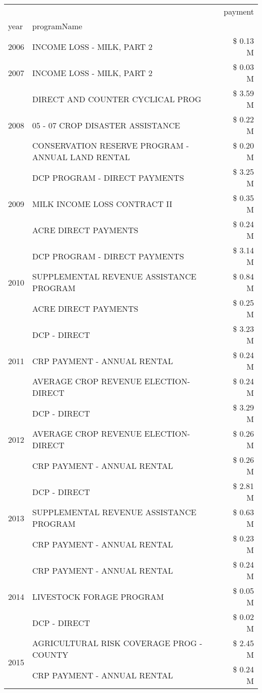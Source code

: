 \begin{tabular}{llr}
\toprule
 &  & payment \\
year & programName &  \\
\midrule
2006 & INCOME LOSS - MILK, PART 2 & \$ 0.13 M \\
\cline{1-3}
2007 & INCOME LOSS - MILK, PART 2 & \$ 0.03 M \\
\cline{1-3}
\multirow[t]{3}{*}{2008} & DIRECT AND COUNTER CYCLICAL PROG & \$ 3.59 M \\
 & 05 - 07 CROP DISASTER ASSISTANCE & \$ 0.22 M \\
 & CONSERVATION RESERVE PROGRAM - ANNUAL LAND RENTAL & \$ 0.20 M \\
\cline{1-3}
\multirow[t]{3}{*}{2009} & DCP PROGRAM - DIRECT PAYMENTS & \$ 3.25 M \\
 & MILK INCOME LOSS CONTRACT II & \$ 0.35 M \\
 & ACRE DIRECT PAYMENTS & \$ 0.24 M \\
\cline{1-3}
\multirow[t]{3}{*}{2010} & DCP PROGRAM - DIRECT PAYMENTS & \$ 3.14 M \\
 & SUPPLEMENTAL REVENUE ASSISTANCE PROGRAM & \$ 0.84 M \\
 & ACRE DIRECT PAYMENTS & \$ 0.25 M \\
\cline{1-3}
\multirow[t]{3}{*}{2011} & DCP - DIRECT & \$ 3.23 M \\
 & CRP PAYMENT - ANNUAL RENTAL & \$ 0.24 M \\
 & AVERAGE CROP REVENUE ELECTION-DIRECT & \$ 0.24 M \\
\cline{1-3}
\multirow[t]{3}{*}{2012} & DCP - DIRECT & \$ 3.29 M \\
 & AVERAGE CROP REVENUE ELECTION-DIRECT & \$ 0.26 M \\
 & CRP PAYMENT - ANNUAL RENTAL & \$ 0.26 M \\
\cline{1-3}
\multirow[t]{3}{*}{2013} & DCP - DIRECT & \$ 2.81 M \\
 & SUPPLEMENTAL REVENUE ASSISTANCE PROGRAM & \$ 0.63 M \\
 & CRP PAYMENT - ANNUAL RENTAL & \$ 0.23 M \\
\cline{1-3}
\multirow[t]{3}{*}{2014} & CRP PAYMENT - ANNUAL RENTAL & \$ 0.24 M \\
 & LIVESTOCK FORAGE PROGRAM & \$ 0.05 M \\
 & DCP - DIRECT & \$ 0.02 M \\
\cline{1-3}
\multirow[t]{3}{*}{2015} & AGRICULTURAL RISK COVERAGE PROG - COUNTY & \$ 2.45 M \\
 & CRP PAYMENT - ANNUAL RENTAL & \$ 0.24 M \\

\end{tabular}
